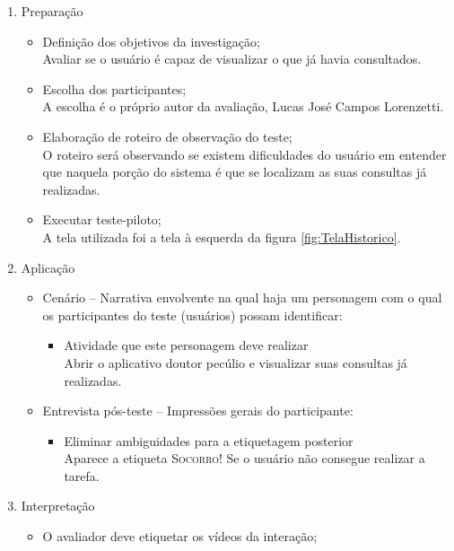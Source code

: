 \par \noindent
\begin{enumerate}
\item Preparação
    \begin{itemize}
    \item Definição dos objetivos da investigação; \\
        Avaliar se o usuário é capaz de visualizar o que já havia consultados.
    \item Escolha dos participantes; \\
        A escolha é o próprio autor da avaliação, Lucas José Campos 
        Lorenzetti.
    \item Elaboração de roteiro de observação do teste; \\
        O roteiro será observando se existem dificuldades do usuário em entender que 
        naquela porção do sistema é que se localizam as suas consultas já realizadas.
    \item Executar teste-piloto; \\
        A tela utilizada foi a tela à esquerda da figura \ref{fig:TelaHistorico}.
    \end{itemize}
\item Aplicação
    \begin{itemize}
    \item Cenário -- Narrativa envolvente na qual haja um personagem com o 
        qual os participantes do teste (usuários) possam identificar:
        \begin{itemize}
        \item Atividade que este personagem deve realizar \\
            Abrir o aplicativo doutor pecúlio e visualizar suas consultas já realizadas.
        \end{itemize}
    \item Entrevista pós-teste -- Impressões gerais do participante:
        \begin{itemize}
        \item Eliminar ambiguidades para a etiquetagem posterior \\
            Aparece a etiqueta \textsc{Socorro!} Se o usuário não consegue realizar a tarefa.
        \end{itemize}
    \end{itemize}
\item Interpretação
    \begin{itemize}
    \item O avaliador deve etiquetar os vídeos da interação;

\end{itemize}
\end{enumerate}
